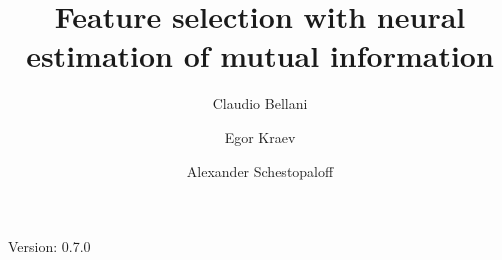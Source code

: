 \documentclass{mypaper}
\author[1]{
Claudio Bellani
}
\author[2]{
Egor Kraev
}
\author[1]{
Alexander Schestopaloff
}
\affil[1]{
	Queen Mary University of London
}
\affil[2]{
	Wise Payments Ltd.
}
\title{Feature selection with neural estimation of mutual information}
\begin{document}
\maketitle

Version: 0.7.0







\end{document}
